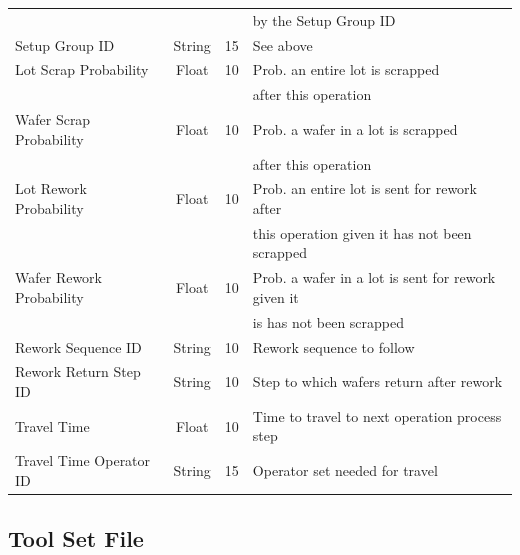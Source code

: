 \begin{center}
\begin{tabular}{|l|c|c|l|}
    & & & by the Setup Group ID  \\
   Setup Group ID & String & 15 & See above \\
   Lot Scrap Probability & Float & 10 & Prob. an entire lot is scrapped \\
    & & & after this operation \\
   Wafer Scrap Probability & Float & 10 & Prob. a wafer in a lot is
   scrapped \\
    & & & after this operation \\
   Lot Rework Probability & Float & 10 & Prob. an entire lot is
   sent for rework after \\
    & & & this operation given it has not been scrapped \\
   Wafer Rework Probability & Float & 10 & Prob. a wafer in a lot
   is sent for rework given it \\
    & & & is has not been scrapped \\
   Rework Sequence ID & String & 10 & Rework sequence to follow \\
   Rework Return Step ID & String & 10 & Step to which wafers return
   after rework \\
   Travel Time & Float & 10 & Time to travel to next operation process step \\
   Travel Time Operator ID & String & 15 &  Operator set
   needed for travel \\ \hline
   \end{tabular}
   \end{center}
   
   \subsection{Tool Set File}
   
